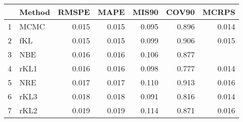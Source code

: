 \documentclass[12pt]{article}
\begin{document}
\thispagestyle{empty}
\begin{table}[ht]
\centering
\begin{tabular}{rlrrrrr}
  \hline
 & Method & RMSPE & MAPE & MIS90 & COV90 & MCRPS \\ 
  \hline
1 & MCMC & 0.015 & 0.015 & 0.095 & 0.896 & 0.014 \\ 
  2 & fKL & 0.015 & 0.015 & 0.099 & 0.906 & 0.015 \\ 
  3 & NBE & 0.016 & 0.016 & 0.106 & 0.877 &  \\ 
  4 & rKL1 & 0.016 & 0.016 & 0.098 & 0.777 & 0.014 \\ 
  5 & NRE & 0.017 & 0.017 & 0.110 & 0.913 & 0.016 \\ 
  6 & rKL3 & 0.018 & 0.018 & 0.091 & 0.816 & 0.014 \\ 
  7 & rKL2 & 0.019 & 0.019 & 0.114 & 0.871 & 0.016 \\ 
   \hline
\end{tabular}
\end{table}
\end{document}
